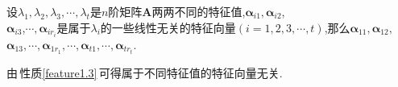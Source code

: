 \documentclass[9pt,a4paper]{book}
\begin{document}
\begin{feature}[矩阵所有的特征向量都是线性无关的]\label{feature1.3}
	设$ \lambda_1,\lambda_2,\lambda_3,\cdots,\lambda_t $是$ n $阶矩阵$ \bm{A} $两两不同的特征值,$\bm{\alpha}_{i1}$$,\bm{\alpha}_{i2}$,\\$\bm{\alpha}_{i3}$,$\cdots,\bm{\alpha}_{ir_i} $是属于$ \lambda_i $的一些线性无关的特征向量$ (i=1,2,3,\cdots,t) $,那么$ \bm{\alpha}_{11},\bm{\alpha}_{12}, $$\bm{\alpha}_{13},\cdots,$$\bm{\alpha}_{1r_1}$$,\cdots,\bm{\alpha}_{t1},\cdots$$,\bm{\alpha}_{tr_t} $.
\end{feature}
\begin{feature}
	由\,性质\ref{feature1.3}\,可得属于不同特征值的特征向量无关.
\end{feature}

\newpage
\end{document}
